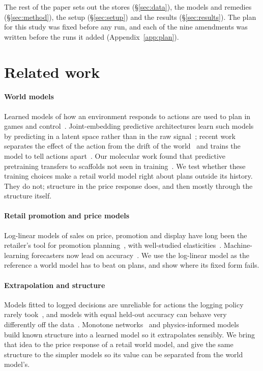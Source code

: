 The rest of the paper sets out the stores (\S\ref{sec:data}), the models and remedies (\S\ref{sec:method}), the
setup (\S\ref{sec:setup}) and the results (\S\ref{sec:results}). The plan for this study was fixed before any run,
and each of the nine amendments was written before the runs it added (Appendix~\ref{app:plan}).

\section{Related work}\label{sec:related}

\paragraph{World models} Learned models of how an environment responds to actions are used to plan in games and
control~\cite{worldmodels,planet,dreamerv3,tdmpc2}. Joint-embedding predictive architectures learn such models by
predicting in a latent space rather than in the raw signal~\cite{lecun2022,ijepa,vjepa2,leworldmodel}; recent work
separates the effect of the action from the drift of the world~\cite{dwm} and trains the model to tell actions
apart~\cite{adwm}. Our molecular work found that predictive pretraining transfers to scaffolds not seen in
training~\cite{mjepa}. We test whether these training choices make a retail world model right about plans outside
its history. They do not; structure in the price response does, and then mostly through the structure itself.

\paragraph{Retail promotion and price models} Log-linear models of sales on price, promotion and display have long
been the retailer's tool for promotion planning~\cite{promocast,vanheerde2000,vanheerde2003}, with well-studied
elasticities~\cite{hoch1995,bijmolt2005}. Machine-learning forecasters now lead on accuracy~\cite{m5accuracy,
fildes2022,ma2016}. We use the log-linear model as the reference a world model has to beat on plans, and show where
its fixed form fails.

\paragraph{Extrapolation and structure} Models fitted to logged decisions are unreliable for actions the logging
policy rarely took~\cite{levine2020,pearl2009}, and models with equal held-out accuracy can behave very differently
off the data~\cite{damour2022}. Monotone networks~\cite{sill1998,you2017} and physics-informed models~\cite{
karniadakis2021} build known structure into a learned model so it extrapolates sensibly. We bring that idea to the
price response of a retail world model, and give the same structure to the simpler models so its value can be
separated from the world model's.

